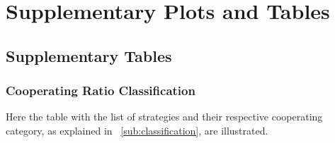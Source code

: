 \chapter{Supplementary Plots and Tables}

\section{Supplementary Tables}
\subsection{Cooperating Ratio Classification}
\label{append:class-categories}
Here the table with the list of strategies and their respective cooperating
category, as explained in ~\ref{sub:classification}, are illustrated.

		\small
